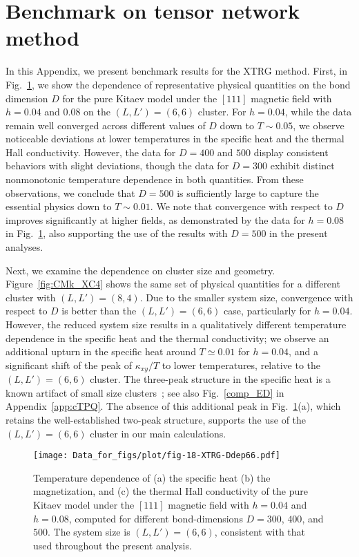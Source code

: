 \documentclass[twocolumn,superscriptaddress,showpacs, longbibliography, aps, prx]{revtex4-2}
\begin{document}
\appendix
\section{Benchmark on tensor network method}
\label{app:XTRG_Bench}
In this Appendix, we present benchmark results for the XTRG method. 
First, in Fig.~\ref{fig:CMk_XC6}, we show the dependence of representative physical quantities on the bond dimension $D$ for the pure Kitaev model under the $[111]$ magnetic field with $h=0.04$ and $0.08$ on the $(L, L') = (6, 6)$ cluster.
For $h=0.04$, while the data remain well converged across different values of $D$ down to $T\sim 0.05$, we observe noticeable deviations at lower temperatures in the specific heat and the thermal Hall conductivity. 
However, the data for $D=400$ and $500$ display consistent behaviors with slight deviations, though the data for $D=300$ exhibit distinct nonmonotonic temperature dependence in both quantities. 
From these observations, we conclude that $D=500$ is sufficiently large to capture the essential physics down to $T\sim 0.01$. 
We note that convergence with respect to $D$ improves significantly at higher fields, as demonstrated by the data for $h=0.08$ in Fig.~\ref{fig:CMk_XC6}, also supporting the use of the results with $D=500$ in the present analyses. 

Next, we examine the dependence on cluster size and geometry. Figure~\ref{fig:CMk_XC4} shows the same set of physical quantities for a different cluster with $(L, L') = (8, 4)$. Due to the smaller system size, convergence with respect to $D$ is better than the $(L, L') = (6, 6)$ case, particularly for $h=0.04$. However, the reduced system size results in a qualitatively different temperature dependence in the specific heat and the thermal conductivity; we observe an additional upturn in the specific heat around $T\simeq 0.01$ for $h=0.04$, and a significant shift of the peak of $\kappa_{xy}/T$ to lower temperatures, relative to the $(L, L') = (6, 6)$ cluster. 
The three-peak structure in the specific heat is a known artifact of small size clusters~\cite{NasuUM2015}; see also Fig.~\ref{comp_ED} in Appendix~\ref{app:cTPQ}. The absence of this additional peak in Fig.~\ref{fig:CMk_XC6}(a), which retains the well-established two-peak structure, supports the use of the $(L, L') = (6, 6)$ cluster in our main calculations. 

\begin{figure}[htb]
  \begin{center}
    \texttt{[image: Data\_for\_figs/plot/fig-18-XTRG-Ddep66.pdf]}
  \end{center}
  \caption{Temperature dependence of (a) the specific heat (b) the magnetization, and (c) the thermal Hall conductivity of the pure Kitaev model under the $[111]$ magnetic field with $h=0.04$ and $h=0.08$, computed for different bond-dimensions $D=300$, $400$, and $500$. The system size is $(L, L') = (6, 6)$, consistent with that used throughout the present analysis.
}
  \label{fig:CMk_XC6}
\end{figure}
\end{document}
